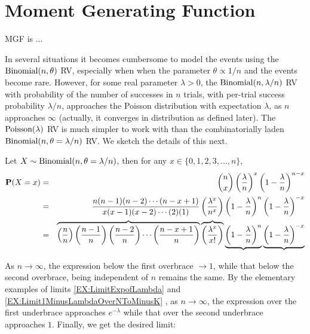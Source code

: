 \section{Moment Generating Function}

\begin{definition}[MGF]
MGF is ...
\end{definition}

\vspace{10cm}

In several situations it becomes cumbersome to model the events using the $\mbox{{\rm Binomial}}(n,\theta)$ RV, especially when when the parameter $\theta \propto 1/n$ and the events become rare.  However, for some real parameter $\lambda>0$, the $\mbox{{\rm Binomial}}(n,\lambda/n)$ RV with probability of the number of successes in $n$ trials, with per-trial success probability $\lambda/n$, approaches the Poisson distribution with expectation $\lambda$, as $n$ approaches $\infty$ (actually, it converges in distribution as defined later).  The $\mbox{{\rm Poisson}}(\lambda)$ RV is much simpler to work with than the combinatorially laden $\mbox{{\rm Binomial}}(n,\theta=\lambda/n)$ RV.  We sketch the details of this next.

Let $X \sim \mbox{{\rm Binomial}}(n,\theta=\lambda/n)$, then for any $x \in \{0,1,2,3,\ldots,n\}$,
\begin{eqnarray}
\mathbf{P}(X=x)
&=&
\binom{n}{x} \left( \frac{\lambda}{n} \right)^x \left( 1- \frac{\lambda}{n} \right)^{n-x} \notag \\
&=& \frac{n(n-1)(n-2)\cdots(n-x+1)}{x(x-1)(x-2)\cdots (2)(1)}
\left( \frac{\lambda^x}{n^x} \right)
\left( 1- \frac{\lambda}{n} \right)^n
\left( 1- \frac{\lambda}{n} \right)^{-x} \notag \\
&=&
\overbrace{\left( \frac{n}{n} \right) \left( \frac{n-1}{n} \right) \left( \frac{n-2}{n} \right) \cdots \left( \frac{n-x+1}{n} \right)}
\overbrace{\left( \frac{\lambda^x}{x!} \right)}
\underbrace{\left( 1- \frac{\lambda}{n} \right)^n}
\underbrace{\left( 1- \frac{\lambda}{n} \right)^{-x}}  \notag \\
\end{eqnarray}

As $n \to \infty$, the expression below the first overbrace $\to 1$, while that below the second overbrace, being independent of $n$ remains the same.  By the elementary examples of limits
\ref*{EX:LimitExpofLambda} and \ref*{EX:Limit1MinusLambdaOverNToMinusK}%
, as $n \to \infty$, the expression over the first underbrace approaches $e^{-\lambda}$ while that over the second underbrace approaches $1$.  Finally, we get the desired limit:

